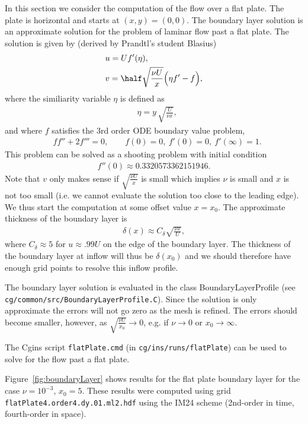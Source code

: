 \documentclass[10pt]{article}
\begin{document}
In this section we consider the computation of the flow over a flat plate.
The plate is horizontal and starts at $(x,y)=(0,0)$.
The boundary layer solution is an approximate solution for the problem of laminar flow past a flat plate. The
solution is given by (derived by Prandtl's student Blasius)
\begin{align*}
   & u = U f'(\eta), \\
   & v = \half \sqrt{\frac{\nu U}{x}} \Big( \eta f' - f \Big), 
\end{align*}
where the similiarity variable $\eta$ is defined as
\begin{align*}
   & \eta = y\, \sqrt{\frac{U}{\nu x}},
\end{align*}
and where $f$ satisfies the 3rd order ODE boundary value problem, 
\begin{align*}
   & f f'' + 2 f ''' = 0, \qquad f(0)=0, ~ f'(0)=0, ~ f'(\infty)=1.
\end{align*}
This problem can be solved as a shooting problem with initial condition
\begin{align*}
   f''(0) \approx 0.3320573362151946 .
\end{align*}
Note that $v$ only makes sense if $\sqrt{\frac{\nu U}{x}}$ is small which implies $\nu$ is small
and $x$ is not too small (i.e. we cannot evaluate the solution too close to the leading edge). 
We thus start the computation at some offset value $x=x_0$. 
% 
The approximate thickness of the boundary layer is
\begin{align*}
   \delta(x) \approx C_\delta \sqrt{\frac{\nu x}{U}} , 
\end{align*}
where $C_\delta\approx 5$ for $u\approx .99 U$ on the edge of the boundary layer. 
The thickness of the boundary layer at inflow will thus be $\delta(x_0)$ and we should therefore have
enough grid points to resolve this inflow profile.

The boundary layer solution is evaluated in the class BoundaryLayerProfile (see {\tt cg/common/src/BoundaryLayerProfile.C}). 
Since the solution is only approximate the errors will not go zero as the mesh is refined.
The errors should become smaller, however, as $\sqrt{\frac{\nu U}{x_0}} \rightarrow 0$, e.g. 
if $\nu\rightarrow 0$ or $x_0\rightarrow\infty$. 


The Cgins script {\tt flatPlate.cmd} (in {\tt cg/ins/runs/flatPlate}) can be used to solve for the flow past a flat plate.

Figure~\ref{fig:boundaryLayer} shows results for the flat plate boundary layer for the
case $\nu=10^{-3}$, $x_0=5$. These results were computed using grid {\tt flatPlate4.order4.dy.01.ml2.hdf} using the IM24 scheme (2nd-order
in time, fourth-order in space). 
\end{document}
